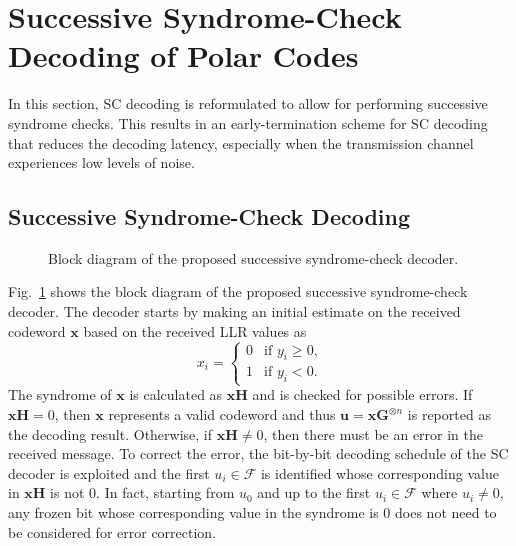 \documentclass[conference]{IEEEtran}
\begin{document}
\section{Successive Syndrome-Check Decoding of Polar Codes}

In this section, SC decoding is reformulated to allow for performing successive syndrome checks. This results in an early-termination scheme for SC decoding that reduces the decoding latency, especially when the transmission channel experiences low levels of noise.

\subsection{Successive Syndrome-Check Decoding}

\begin{figure}
    \centering
    
    \caption{Block diagram of the proposed successive syndrome-check decoder.}
    \label{fig:blockDiagram}
\end{figure}

Fig.~\ref{fig:blockDiagram} shows the block diagram of the proposed successive syndrome-check decoder. The decoder starts by making an initial estimate on the received codeword $\bm{x}$ based on the received LLR values as
\begin{equation}
    x_i = \begin{cases}0 & \text{if } y_i\geq0 \text{,}
    \\1 & \text{if } y_i<0 \text{.} \end{cases} \label{eq:xinit}
\end{equation}
The syndrome of $\bm{x}$ is calculated as $\bm{x}\bm{H}$ and is checked for possible errors. If $\bm{x}\bm{H}=0$, then $\bm{x}$ represents a valid codeword and thus $\bm{u} = \bm{x}\bm{G}^{\otimes n}$ is reported as the decoding result. Otherwise, if $\bm{x}\bm{H}\neq 0$, then there must be an error in the received message. To correct the error, the bit-by-bit decoding schedule of the SC decoder is exploited and the first $u_i \in \mathcal{F}$ is identified whose corresponding value in $\bm{x}\bm{H}$ is not $0$. In fact, starting from $u_0$ and up to the first $u_i \in \mathcal{F}$ where $u_i \neq 0$, any frozen bit whose corresponding value in the syndrome is $0$ does not need to be considered for error correction.
\end{document}

